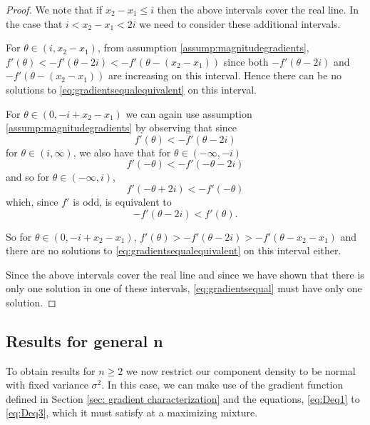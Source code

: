 \begin{proof}
			We note that if $x_2 - x_1 \leq i$ then the above intervals cover the real line. In the case that $i <x_2 - x_1 < 2i$ we need to consider these additional intervals.

			For $\theta \in (i,x_2 - x_1)$, from assumption \ref{assump:magnitudegradients}, $f'(\theta) < -f'(\theta - 2i) < -f'(\theta - (x_2 - x_1))$ since both $-f'(\theta - 2i)$ and $-f'(\theta - (x_2 - x_1))$ are increasing on this interval. Hence there can be no solutions to \eqref{eq:gradientsequalequivalent} on this interval.
			
			For $\theta \in (0, -i+x_2 - x_1)$ we can again use assumption \ref{assump:magnitudegradients} by observing that since 
			\begin{equation}
				f'(\theta) < -f'(\theta - 2i)
			\end{equation}
			for $\theta \in (i, \infty)$, we also have that for $\theta \in (-\infty, -i)$
			\begin{equation}
				f'(-\theta) < -f'(-\theta - 2i)
			\end{equation}
			and so for $\theta \in (-\infty, i)$,
			\begin{equation}
				f'(-\theta + 2i) < -f'(-\theta)
			\end{equation}
			which, since $f'$ is odd, is equivalent to 
			\begin{equation}
				-f'(\theta - 2i) < f'(\theta).
			\end{equation}

			So for $\theta \in (0,-i+x_2-x_1)$,  $f'(\theta)>-f'(\theta - 2i) > -f'(\theta - x_2 - x_1)$ and there are no solutions to \eqref{eq:gradientsequalequivalent} on this interval either.
			
			Since the above intervals cover the real line and since we have shown that there is only one solution in one of these intervals, \eqref{eq:gradientsequal} must have only one solution.
		\end{proof}

	\subsection{Results for general n}
	To obtain results for $n \geq 2$ we now restrict our component density to be normal with fixed variance $\sigma^2$. In this case, we can make use of the gradient function defined in Section \ref{sec: gradient characterization} and the equations, \eqref{eq:Deq1} to \eqref{eq:Deq3}, which it must satisfy at a maximizing mixture.


